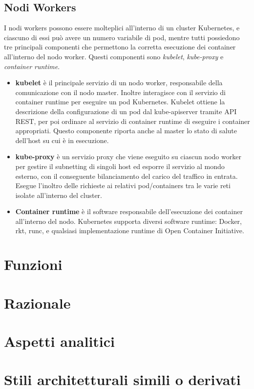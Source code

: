 \documentclass[12pt, a4paper]{report}
\begin{document}
\section{Nodi Workers}
I nodi workers possono essere molteplici all'interno di un cluster Kubernetes, e ciascuno di essi può avere un numero variabile di pod, mentre tutti possiedono tre principali componenti che permettono la corretta esecuzione dei container all'interno del nodo worker. Questi componenti sono \textit{kubelet}, \textit{kube-proxy} e \textit{container runtime}.
\begin{itemize}
  \item \textbf{kubelet} è il principale servizio di un nodo worker, responsabile della comunicazione con il nodo master. Inoltre interagisce con il servizio di container runtime per eseguire un pod Kubernetes. Kubelet ottiene la descrizione della configurazione di un pod dal kube-apiserver tramite API REST, per poi ordinare al servizio di container runtime di eseguire i container appropriati. Questo componente riporta anche al master lo stato di salute dell'host su cui è in esecuzione.
  \item \textbf{kube-proxy} è un servizio proxy che viene eseguito su ciascun nodo worker per gestire il subnetting di singoli host ed esporre il servizio al mondo esterno, con il conseguente bilanciamento del carico del traffico in entrata. Esegue l'inoltro delle richieste ai relativi pod/containers tra le varie reti isolate all'interno del cluster.
  \item \textbf{Container runtime} è il software responsabile dell'esecuzione dei container all'interno del nodo. Kubernetes supporta diversi software runtime: Docker, rkt, runc, e qualsiasi implementazione runtime di Open Container Initiative.
\end{itemize}
\chapter{Funzioni}

\chapter{Razionale}
\chapter{Aspetti analitici}
\chapter{Stili architetturali simili o derivati}

\end{document}
